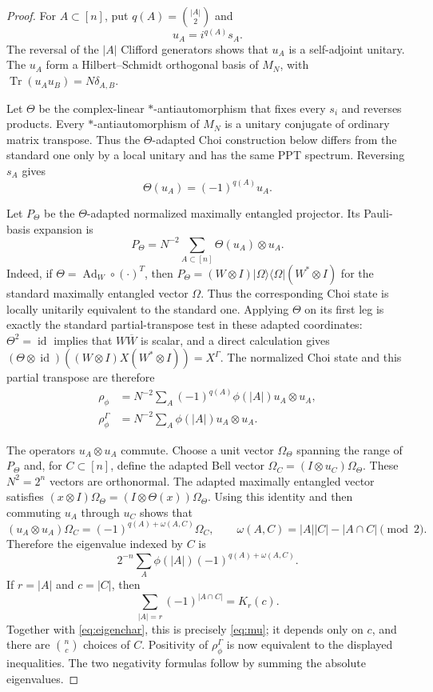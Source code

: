 \documentclass[11pt]{article}
\newcommand{\Tr}{\operatorname{Tr}}
\newcommand{\id}{\operatorname{id}}
\begin{document}
\begin{proof}
For $A\subset[n]$, put $q(A)=\binom{|A|}{2}$ and
\[
 u_A=i^{q(A)}s_A.
\]
The reversal of the $|A|$ Clifford generators shows that $u_A$ is a
self-adjoint unitary.  The $u_A$ form a Hilbert--Schmidt orthogonal basis of
$M_N$, with $\Tr(u_Au_B)=N\delta_{A,B}$.

Let $\Theta$ be the complex-linear $*$-antiautomorphism that fixes every
$s_i$ and reverses products.  Every $*$-antiautomorphism of $M_N$ is a
unitary conjugate of ordinary matrix transpose.  Thus the
$\Theta$-adapted Choi construction below differs from the standard one only
by a local unitary and has the same PPT spectrum.  Reversing $s_A$ gives
\begin{equation}\label{eq:theta}
 \Theta(u_A)=(-1)^{q(A)}u_A.
\end{equation}

Let $P_\Theta$ be the $\Theta$-adapted normalized maximally entangled
projector.  Its Pauli-basis expansion is
\[
 P_\Theta
 =N^{-2}\sum_{A\subset[n]}\Theta(u_A)\otimes u_A.
\]
Indeed, if $\Theta=\operatorname{Ad}_W\circ(\cdot)^T$, then
$P_\Theta=(W\otimes I)|\Omega\rangle\langle\Omega|(W^*\otimes I)$ for the
standard maximally entangled vector $\Omega$.  Thus the corresponding Choi
state is locally unitarily equivalent to the standard one.  Applying
$\Theta$ on its first leg is exactly the standard partial-transpose test in
these adapted coordinates: $\Theta^2=\id$ implies that $W\overline W$ is
scalar, and a direct calculation gives
$(\Theta\otimes\id)((W\otimes I)X(W^*\otimes I))=X^\Gamma$.
The normalized Choi state and this partial
transpose are therefore
\begin{align*}
 \rho_\phi
 &=N^{-2}\sum_A(-1)^{q(A)}\phi(|A|)u_A\otimes u_A,\\
 \rho_\phi^\Gamma
 &=N^{-2}\sum_A\phi(|A|)u_A\otimes u_A.
\end{align*}

The operators $u_A\otimes u_A$ commute.  Choose a unit vector
$\Omega_\Theta$ spanning the range of $P_\Theta$ and, for $C\subset[n]$,
define the adapted Bell vector
$\Omega_C=(I\otimes u_C)\Omega_\Theta$.  These $N^2=2^n$ vectors are
orthonormal.  The adapted maximally entangled vector satisfies
$(x\otimes I)\Omega_\Theta=(I\otimes\Theta(x))\Omega_\Theta$.
Using this identity and then commuting $u_A$ through $u_C$ shows that
\begin{equation}\label{eq:eigenchar}
 (u_A\otimes u_A)\Omega_C
 =(-1)^{q(A)+\omega(A,C)}\Omega_C,
 \qquad
 \omega(A,C)=|A||C|-|A\cap C|\pmod 2.
\end{equation}
Therefore the eigenvalue indexed by $C$ is
\[
 2^{-n}\sum_A\phi(|A|)(-1)^{q(A)+\omega(A,C)}.
\]
If $r=|A|$ and $c=|C|$, then
\[
 \sum_{|A|=r}(-1)^{|A\cap C|}=K_r(c).
\]
Together with \eqref{eq:eigenchar}, this is precisely \eqref{eq:mu}; it
depends only on $c$, and there are $\binom nc$ choices of $C$.  Positivity of
$\rho_\phi^\Gamma$ is now equivalent to the displayed inequalities.  The two
negativity formulas follow by summing the absolute eigenvalues.
\end{proof}
\end{document}
